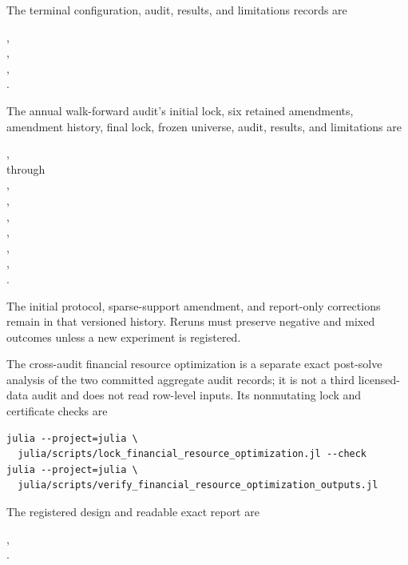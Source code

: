The terminal configuration, audit, results, and limitations records are
\begin{center}
,\\
,\\
,\\
.
\end{center}
The annual walk-forward audit's initial lock, six retained amendments,
amendment history, final lock, frozen universe, audit, results, and limitations
are
\begin{center}
,\\
 through\\
,\\
,\\
,\\
,\\
,\\
,\\
.
\end{center}
The initial protocol, sparse-support amendment, and report-only corrections
remain in that versioned history.  Reruns must preserve negative and mixed
outcomes unless a new experiment is registered.

The cross-audit financial resource optimization is a separate exact
post-solve analysis of the two committed aggregate audit records; it is not a
third licensed-data audit and does not read row-level inputs.  Its nonmutating
lock and certificate checks are
\begin{verbatim}
julia --project=julia \
  julia/scripts/lock_financial_resource_optimization.jl --check
julia --project=julia \
  julia/scripts/verify_financial_resource_optimization_outputs.jl
\end{verbatim}
The registered design and readable exact report are
\begin{center}
,\\
.
\end{center}

